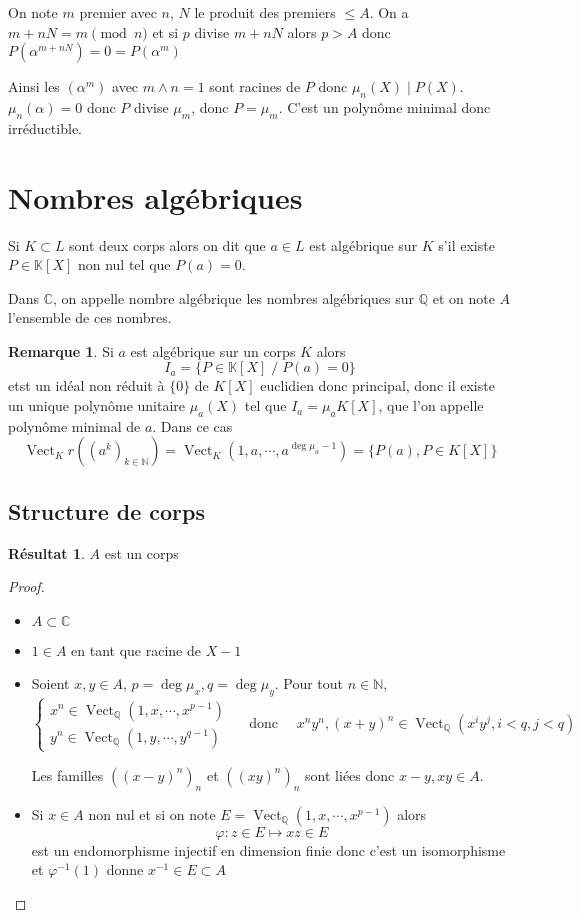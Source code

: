 \documentclass{article}
\theoremstyle{definition}
\newtheorem*{rem}{Remarque}
\newtheorem*{res}{Résultat}
\DeclareMathOperator{\Vect}{Vect}
\begin{document}
On note $m$ premier avec $n$, $N$ le produit des premiers $\leq A$. On a $m+nN=m\pmod n$ et si $p$ divise $m+nN$ alors $p>A$ donc $P(\alpha^{m+nN})=0=P(\alpha^m)$

Ainsi les $(\alpha^{m})$ avec $m\land n=1$ sont racines de $P$ donc $\mu_n(X) \;|\; P(X)$. $\mu_n(\alpha)=0$ donc $P$ divise $\mu_m$, donc $P=\mu_m$. C'est un polynôme minimal donc irréductible.

\section{Nombres algébriques}

Si $K\subset L$ sont deux corps alors on dit que $a\in L$ est algébrique sur $K$ s'il existe $P\in\mathbb K[X]$ non nul tel que $P(a)=0$.

Dans $\mathbb C$, on appelle nombre algébrique les nombres algébriques sur $\mathbb Q$ et on note $A$ l'ensemble de ces nombres.

\begin{rem}
Si $a$ est algébrique sur un corps $K$ alors \[
    I_a=\{P\in\mathbb K[X]\;/\; P(a)=0\}
\]
etst un idéal non réduit à $\{0\}$ de $K[X]$ euclidien donc principal, donc il existe un unique polynôme unitaire $\mu_a(X)$ tel que $I_a=\mu_a K[X]$, que l'on appelle polynôme minimal de $a$. Dans ce cas \[
    \Vect_Kr((a^k)_{k\in\mathbb N})=\Vect_K(1, a, \cdots, a^{\deg \mu_a-1})=\{P(a), P\in K[X]\}
\]
\end{rem}

\subsection{Structure de corps}

\begin{res}
$A$ est un corps
\end{res}

\begin{proof}
\begin{itemize}
    \item $A\subset \mathbb C$
    \item $1\in A$ en tant que racine de $X-1$
    \item Soient $x, y\in A$, $p=\deg \mu_x, q=\deg \mu_y$. Pour tout $n\in\mathbb N$, \[
        \begin{cases}
            x^n\in\Vect_{\mathbb Q}(1, x, \cdots, x^{p-1}) \\ y^n\in\Vect_{\mathbb Q}(1, y, \cdots, y^{q-1})
        \end{cases}\quad\text{ donc }\quad  x^ny^n, (x+y)^n\in\Vect_{\mathbb Q}(x^iy^j, i<q, j<q)
    \]

    Les familles $((x-y)^n)_n$ et $((xy)^n)_n$ sont liées donc $x-y, xy\in A$.
    \item Si $x\in A$ non nul et si on note $E=\Vect_{\mathbb Q}(1, x, \cdots, x^{p-1})$ alors \[
        \varphi: z\in E\longmapsto xz\in E
    \]
    est un endomorphisme injectif en dimension finie donc c'est un isomorphisme et $\varphi^{-1}(1)$ donne $x^{-1}\in E\subset A$
\end{itemize}
\end{proof}
\end{document}
